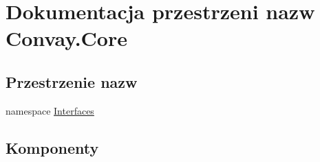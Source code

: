 \hypertarget{namespace_convay_1_1_core}{}\section{Dokumentacja przestrzeni nazw Convay.\+Core}
\label{namespace_convay_1_1_core}
\subsection*{Przestrzenie nazw}
\begin{DoxyCompactItemize}
\item 
namespace \hyperlink{namespace_convay_1_1_core_1_1_interfaces}{Interfaces}
\end{DoxyCompactItemize}
\subsection*{Komponenty}
